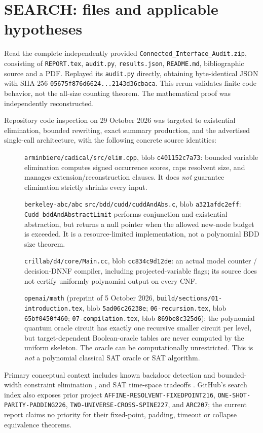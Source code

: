 \documentclass[11pt]{article}
\begin{document}
\section{SEARCH: files and applicable hypotheses}
Read the complete independently provided \texttt{Connected\_Interface\_Audit.zip}, consisting of \texttt{REPORT.tex}, \texttt{audit.py}, \texttt{results.json}, \texttt{README.md}, bibliographic source and a PDF. Replayed its \texttt{audit.py} directly, obtaining byte-identical JSON with SHA-256 \texttt{05675f876d6624...2143d36cbaca}. This rerun validates finite code behavior, not the all-size counting theorem. The mathematical proof was independently reconstructed.

Repository code inspection on 29 October 2026 was targeted to existential elimination, bounded rewriting, exact summary production, and the advertised single-call architecture, with the following concrete source identities:
\begin{description}
\item[]\texttt{arminbiere/cadical/src/elim.cpp}, blob \texttt{c401152c7a73}: bounded variable elimination computes signed occurrence scores, caps resolvent size, and manages extension/reconstruction clauses. It does \emph{not} guarantee elimination strictly shrinks every input.
\item[]\texttt{berkeley-abc/abc} \texttt{src/bdd/cudd/cuddAndAbs.c}, blob \texttt{a321afdc2eff}: \texttt{Cudd\_bddAndAbstractLimit} performs conjunction and existential abstraction, but returns a null pointer when the allowed new-node budget is exceeded. It is a resource-limited implementation, not a polynomial BDD size theorem.
\item[]\texttt{crillab/d4/core/Main.cc}, blob \texttt{cc834c9d12de}: an actual model counter / decision-DNNF compiler, including projected-variable flags; its source does not certify uniformly polynomial output on every CNF.
\item[]\texttt{openai/math} (preprint of 5 October 2026, \texttt{build/sections/01-introduction.tex}, blob \texttt{5ad06c26238e}; \texttt{06-recursion.tex}, blob \texttt{65bf0450f460}; \texttt{07-compilation.tex}, blob \texttt{869be8c325d6}): the polynomial quantum oracle circuit has exactly one recursive smaller circuit per level, but target-dependent Boolean-oracle tables are never computed by the uniform skeleton. The oracle can be computationally unrestricted. This is \emph{not} a polynomial classical SAT oracle or SAT algorithm.
\end{description}
Primary conceptual context includes known backdoor detection and bounded-width constraint elimination \cite{nrs,freuder}, and SAT time-space tradeoffs \cite{flmv,williams}. GitHub's search index also exposes prior project \texttt{AFFINE-RESOLVENT-FIXEDPOINT216}, \texttt{ONE-SHOT-PARITY-PADDING226}, \texttt{TWO-UNIVERSE-CROSS-SPINE227}, and \texttt{ARC207}; the current report claims no priority for their fixed-point, padding, timeout or collapse equivalence theorems.
\end{document}
